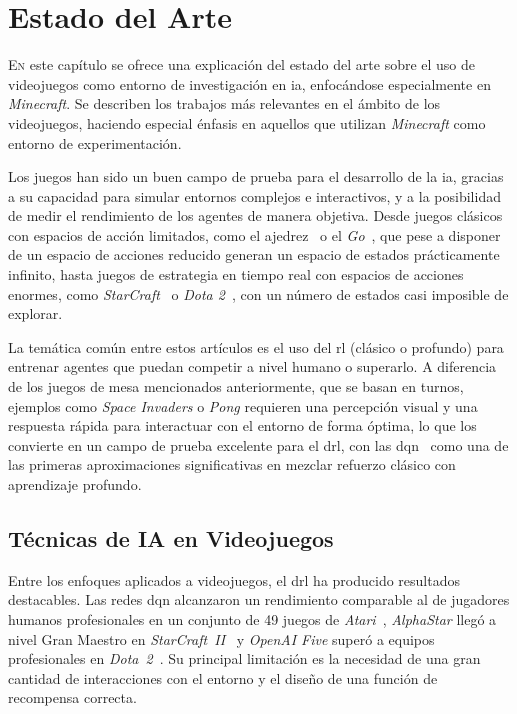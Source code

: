 \chapter{Estado del Arte}
\label{chap:sota}

\lettrine{E}{n} este capítulo se ofrece una explicación del estado del arte sobre 
el uso de videojuegos como entorno de investigación en \gls{ia}, enfocándose especialmente en \textit{Minecraft}. 
Se describen los trabajos más relevantes en el ámbito de los videojuegos, haciendo especial énfasis
en aquellos que utilizan \textit{Minecraft} como entorno de experimentación.

Los juegos han sido un buen campo de prueba para el desarrollo de la \gls{ia}, 
gracias a su capacidad para simular entornos complejos e interactivos, y a la posibilidad de medir el 
rendimiento de los agentes de manera objetiva. 
Desde juegos clásicos con espacios de acción limitados, como el ajedrez~\cite{DBLP:journals/corr/abs-1712-01815}
o el \textit{Go}~\cite{DBLP:journals/nature/SilverHMGSDSAPL16}, que pese a disponer de un espacio de acciones reducido 
generan un espacio de estados prácticamente infinito, hasta juegos de estrategia en tiempo real con espacios de acciones enormes, 
como \textit{StarCraft}~\cite{DBLP:journals/nature/VinyalsBCMDCCPE19} o \textit{Dota 2}~\cite{DBLP:journals/corr/abs-1912-06680},
con un número de estados casi imposible de explorar.

La temática común entre estos artículos es el uso del \gls{rl} (clásico o profundo) para entrenar agentes
que puedan competir a nivel humano o superarlo. A diferencia de los juegos de mesa mencionados anteriormente, que
se basan en turnos, ejemplos como \textit{Space Invaders}
o \textit{Pong} requieren una percepción visual y una respuesta rápida para interactuar con el entorno de forma óptima, 
lo que los convierte en un campo de prueba excelente para el \gls{drl},
con las \gls{dqn}~\cite{DBLP:journals/nature/MnihKSRVBGRFOPB15} como una de las primeras aproximaciones significativas en mezclar
refuerzo clásico con aprendizaje profundo.

\section{Técnicas de IA en Videojuegos}
Entre los enfoques aplicados a videojuegos, el \gls{drl} ha producido resultados destacables. 
Las redes \gls{dqn} alcanzaron un rendimiento comparable al
de jugadores humanos profesionales en un conjunto de \num{49} juegos de \textit{Atari}~\cite{DBLP:journals/nature/MnihKSRVBGRFOPB15},
\textit{AlphaStar} llegó a nivel Gran Maestro en \textit{StarCraft~II}~\cite{DBLP:journals/nature/VinyalsBCMDCCPE19}
y \textit{OpenAI Five} superó a equipos profesionales en \textit{Dota~2}~\cite{DBLP:journals/corr/abs-1912-06680}.
Su principal limitación es la necesidad de una gran cantidad de interacciones con el
entorno y el diseño de una función de recompensa correcta.

